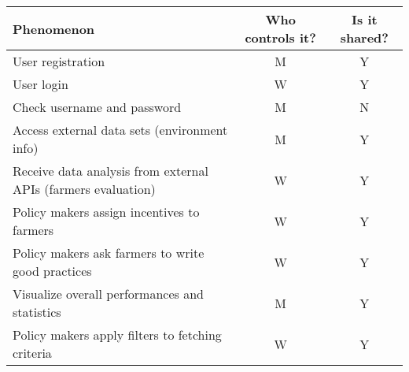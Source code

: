\begin{table}[H]
    \setlength\arrayrulewidth{1pt}
    \centering
    \begin{tabular}{|l|c|c|}
        \rowcolor{myblue}
        \hline
        \color{white}Phenomenon & \color{white}Who controls it?   & \color{white}Is it shared? \\
        \hline
        User registration                                               &   M   &   Y \\
        \hline
        User login                                                      &   W   &   Y \\
        \hline
        Check username and password                                     &   M   &   N \\
        \hline
        Access external data sets (environment info)                                             &   M   &   Y \\
        \hline
        Receive data analysis from external APIs (farmers evaluation)                  &   W   &   Y \\
        \hline
        Policy makers assign incentives to farmers                                     &   W   &   Y \\
        \hline
        Policy makers ask farmers to write good practices                               &   W   &   Y \\
        \hline
        Visualize overall performances and statistics                             &   M   &   Y \\
        
        \hline
        Policy makers apply filters to fetching criteria                             &   W   &   Y \\
        

\end{tabular}
\end{table}
